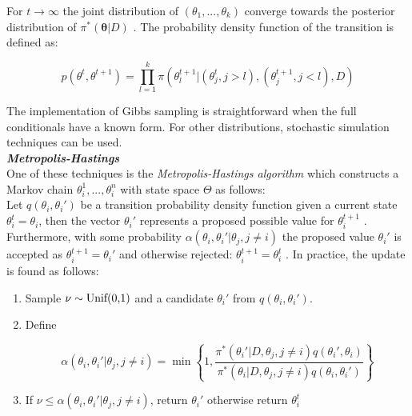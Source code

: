 For $t\rightarrow{}\infty$ the joint distribution of $(\theta_1,...,\theta_k)$ converge towards the posterior distribution of $\pi^*(\bm{\theta}|D)$ \citep{Roberts1994, Geman1984}. The probability density function of the transition is defined as:

\begin{equation}
p(\theta^t,\theta^{t+1})=\prod_{l=1}^k{}\pi(\theta_l^{t+1}|(\theta_j^t,j>l),(\theta_j^{t+1},j<l),D)
\end{equation}

The implementation of Gibbs sampling is straightforward when the full conditionals have a known form. For other distributions, stochastic simulation techniques can be used.\\

\textbf{\textit{Metropolis-Hastings}}\\

One of these techniques is the \emph{Metropolis-Hastings algorithm} \citep{Metropolis1953, Hastings1970} which constructs a Markov chain $\theta_i^1,...,\theta_i^n$ with state space $\Theta$ as follows:\\

Let $q(\theta_i,\theta_i')$ be a transition probability density function given a current state $\theta_i^t=\theta_i$, then the vector $\theta_i'$ represents a proposed possible value for $\theta_i^{t+1}$ \citep{Bernardo2000}. Furthermore, with some probability $\alpha(\theta_i,\theta_i'|\theta_j,j\neq{}i)$ the proposed value $\theta_i'$ is accepted as $\theta_i^{t+1}=\theta_i'$ and otherwise rejected: $\theta_i^{t+1}=\theta_i^t$ \cite{Roberts1994, Hastings1970}. In practice, the update is found as follows:

\begin{enumerate}
\item Sample $\nu\sim\textnormal{Unif(0,1)}$ and a candidate $\theta_i'$ from $q(\theta_i,\theta_i')$.
\item Define

\begin{equation}
\alpha(\theta_i,\theta_i'|\theta_j,j\neq{}i)=\min\left\lbrace{}1,\frac{\pi^*(\theta_i'|D,\theta_j,j\neq{}i)q(\theta_i',\theta_i)}{\pi^*(\theta_i|D,\theta_j,j\neq{}i)q(\theta_i,\theta_i')}\right\rbrace
\end{equation}

\item If $\nu\leq{}\alpha(\theta_i,\theta_i'|\theta_j,j\neq{}i)$, return $\theta_i'$ otherwise return $\theta_i^t$
\end{enumerate}

